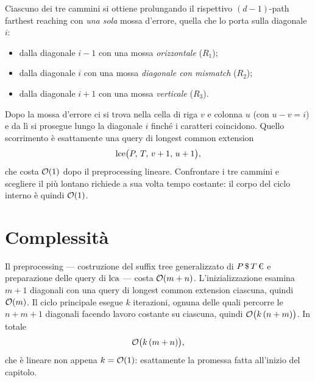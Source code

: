 Ciascuno dei tre cammini si ottiene prolungando il rispettivo $(d-1)$-path
farthest reaching con \emph{una sola} mossa d'errore, quella che lo porta sulla
diagonale $i$:
\begin{itemize}
  \item dalla diagonale $i-1$ con una mossa \emph{orizzontale} \quad ($R_1$);
  \item dalla diagonale $i$ con una mossa \emph{diagonale con mismatch} \quad
        ($R_2$);
  \item dalla diagonale $i+1$ con una mossa \emph{verticale} \quad ($R_3$).
\end{itemize}
Dopo la mossa d'errore ci si trova nella cella di riga $v$ e colonna $u$ (con
$u-v=i$) e da lì si prosegue lungo la diagonale $i$ finché i caratteri
coincidono. Quello scorrimento è esattamente una query di longest common
extension
\[
  \operatorname{lce}\bigl(P,\,T,\,v+1,\,u+1\bigr),
\]
che costa $\mathcal{O}(1)$ dopo il preprocessing lineare. Confrontare i tre cammini e
scegliere il più lontano richiede a sua volta tempo costante: il corpo del ciclo
interno è quindi $\mathcal{O}(1)$.

\section{Complessità}

Il preprocessing --- costruzione del suffix tree generalizzato di
$P\,\text{\$}\,T\,\text{\texteuro}$ e preparazione delle query di $\operatorname{lca}$ ---
costa $\mathcal{O}(m+n)$. L'inizializzazione esamina $m+1$ diagonali con una query di
longest common extension ciascuna, quindi $\mathcal{O}(m)$. Il ciclo principale esegue
$k$ iterazioni, ognuna delle quali percorre le $n+m+1$ diagonali facendo lavoro
costante su ciascuna, quindi $\mathcal{O}\bigl(k\,(n+m)\bigr)$. In totale
\[
  \mathcal{O}\bigl(k\,(m+n)\bigr),
\]
che è lineare non appena $k=\mathcal{O}(1)$: esattamente la promessa fatta all'inizio
del capitolo.
